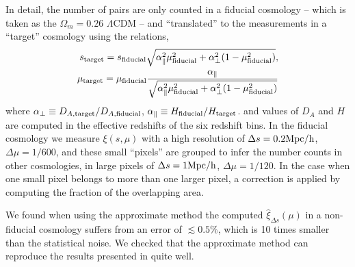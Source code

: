 \documentclass[iop]{emulateapj}
\begin{document}
In detail, the number of pairs are only counted in a fiducial cosmology
-- which is taken as the $\Omega_m=0.26$ $\Lambda$CDM --
and ``translated'' to the measurements in a ``target'' cosmology using the relations, 
\begin{eqnarray}\label{eq:smumap}
 s_{\rm target} = s_{\rm fiducial} \sqrt{\alpha_{\parallel}^2 \mu_{\rm fiducial}^2+\alpha_{\bot}^2(1-\mu_{\rm fiducial}^2)}, \\
 \mu_{\rm target} = \mu_{\rm fiducial} \frac{\alpha_\parallel}
 {\sqrt{\alpha_{\parallel}^2 \mu_{\rm fiducial}^2 +\alpha_{\bot}^2(1-\mu_{\rm fiducial}^2)}}
\end{eqnarray}
where $\alpha_{\bot}\equiv D_{A,\rm target}/D_{A,\rm fiducial}$,
$\alpha_{\parallel}\equiv H_{\rm fiducial}/H_{\rm target}$.
and values of $D_A$ and $H$ are computed in the effective redshifts of the six redshift bins.
In the fiducial cosmology
we measure $\xi(s,\mu)$ with a high resolution of
$\Delta s = 0.2 {\rm Mpc/h}$, $\Delta \mu = 1/600$,
and these small ``pixels'' are grouped to infer 
the number counts in other cosmologies, 
in large pixels of $\Delta s = 1 {\rm Mpc/h}$, $\Delta \mu = 1/120$.
In the case when one small pixel belongs to more than one larger pixel,
a correction is applied by computing the fraction of the overlapping area.

We found when using the approximate method the computed 
$\hat\xi_{\Delta s}(\mu)$ in a non-fiducial cosmology suffers from
an error of $\lesssim0.5\%$, which is 10 times smaller than the statistical noise.
We checked that the approximate method can reproduce the results presented in \cite{Li2016} quite well.
\end{document}
